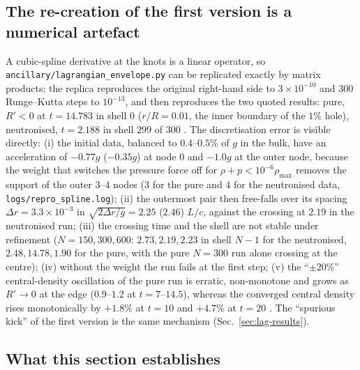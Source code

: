 \documentclass[11pt]{article}
\begin{document}
\subsection{The re-creation of the first version is a numerical artefact}
\label{sec:lag-artefact}

A cubic-spline derivative at the knots is a linear operator, so \texttt{ancillary/lagrangian\_envelope.py} can be replicated exactly by matrix products; the replica reproduces the original right-hand side to $3\times10^{-10}$ and 300 Runge--Kutta steps to $10^{-13}$, and then reproduces the two quoted results: pure, $R'<0$ at $t=14.783$ in shell $0$ ($r/R=0.01$, the inner boundary of the $1\%$ hole), neutronised, $t=2.188$ in shell $299$ of $300$ \LP.  The discretisation error is visible directly: (i) the initial data, balanced to $0.4$--$0.5\%$ of $g$ in the bulk, have an acceleration of $-0.77g$ ($-0.35g$) at node $0$ and $-1.0g$ at the outer node, because the weight that switches the pressure force off for $\rho+p<10^{-6}\rho_{\max}$ removes the support of the outer $3$--$4$ nodes ($3$ for the pure and $4$ for the neutronised data, \texttt{logs/repro\_spline.log}); (ii) the outermost pair then free-falls over its spacing $\Delta r=3.3\times10^{-3}$ in $\sqrt{2\Delta r/g}=2.25$ ($2.46$) $L/c$, against the crossing at $2.19$ in the neutronised run; (iii) the crossing time and the shell are not stable under refinement ($N=150,300,600$: $2.73,2.19,2.23$ in shell $N-1$ for the neutronised, $2.48,14.78,1.90$ for the pure, with the pure $N=300$ run alone crossing at the centre); (iv) without the weight the run fails at the first step; (v) the ``$\pm20\%$'' central-density oscillation of the pure run is erratic, non-monotone and grows as $R'\to0$ at the edge ($0.9$--$1.2$ at $t=7$--$14.5$), whereas the converged central density rises monotonically by $+1.8\%$ at $t=10$ and $+4.7\%$ at $t=20$ \LP.  The ``spurious kick'' of the first version is the same mechanism (Sec.~\ref{sec:lag-results}).

\subsection{What this section establishes}
\label{sec:lag-summary}
\end{document}
